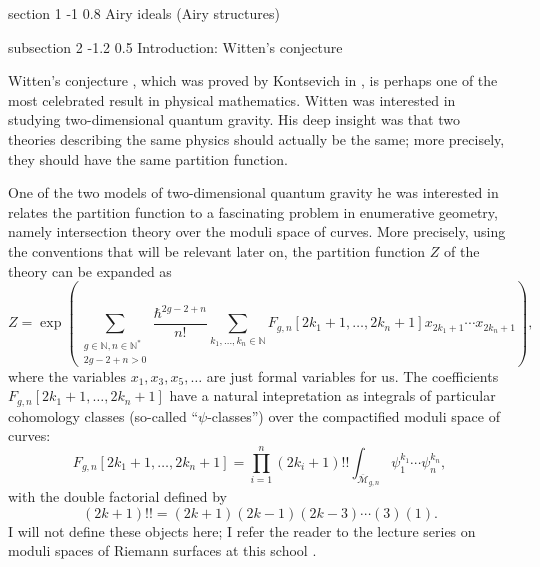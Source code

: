 \documentclass[reqno,oneside,11pt]{amsart}
\makeatletter
\theoremstyle{plain}
\theoremstyle{definition}
\theoremstyle{remark}
\numberwithin{equation}{section}
\renewcommand{\section}{\@startsection
{section}%
{1}%
{\z@}%
{-1\baselineskip}%
{0.8\baselineskip}%
{\centering\scshape\large}} %
\renewcommand{\subsection}{\@startsection
{subsection}%
{2}%
{\z@}%
{-1.2\baselineskip}%
{0.5\baselineskip}%
{\normalfont \bf \normalsize}} %
\makeatother
\begin{document}
\section{Airy ideals (Airy structures)}

\label{s:airy}

\subsection{Introduction: Witten's conjecture}


Witten's conjecture \cite{Wi91}, which was proved by Kontsevich in \cite{Ko91}, is perhaps one of the most celebrated result in physical mathematics. Witten was interested in studying two-dimensional quantum gravity. His deep insight was that two theories describing the same physics should actually be the same; more precisely, they should have the same partition function.

One of the two models of two-dimensional quantum gravity he was interested in relates the partition function to a fascinating problem in enumerative geometry, namely intersection theory over the moduli space of curves. More precisely, using the conventions that will be relevant later on, the partition function $Z$ of the theory can be expanded as
\begin{equation}\label{eq:ZZ}
Z = \exp\left( \sum_{\substack{g \in \mathbb{N}, n \in \mathbb{N}^* \\ 2g-2+n > 0}} \frac{\hbar^{2g-2+n}}{n!}  \sum_{k_1, \ldots, k_n \in \mathbb{N}}  F_{g,n}[2k_1+1, \ldots,2k_n+1]  x_{2k_1+1} \cdots x_{2k_n+1}\right),
\end{equation}
where the variables $x_1, x_3, x_5, \ldots$ are just formal variables for us. The coefficients $F_{g,n}[2k_1+1, \ldots,2k_n+1]$ have a natural intepretation as integrals of particular cohomology classes (so-called ``$\psi$-classes'') over the compactified moduli space of curves:
\begin{equation}
F_{g,n}[2k_1+1, \ldots,2k_n+1] = \prod_{i=1}^n (2 k_i+1)!! \int_{\overline{\mathcal{M}}_{g,n}} \psi_1^{k_1} \cdots \psi_n^{k_n},
\end{equation}
with the double factorial defined by
\begin{equation}
(2k+1) !! = (2k+1) (2k-1) (2k-3) \cdots (3)(1).
\end{equation}
I will not define these objects here; I refer the reader to the lecture series on moduli spaces of Riemann surfaces at this school \cite{GL24}.
\end{document}
